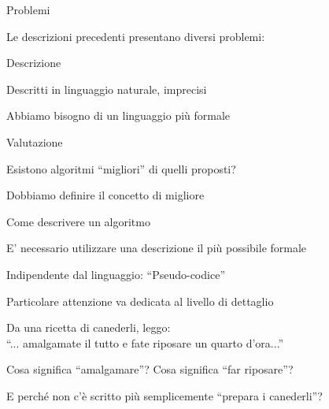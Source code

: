 \begin{frame}{Problemi}

Le descrizioni precedenti presentano diversi problemi:

\BIL
\item {\large\alert{Descrizione}}
\BI
\item Descritti in linguaggio naturale, imprecisi
\item Abbiamo bisogno di un linguaggio più formale
\EI
\item {\large\alert{Valutazione}}
\BI
\item Esistono algoritmi “migliori” di quelli proposti?
\item Dobbiamo definire il concetto di migliore
\EI
\EIL

\end{frame}

\begin{frame}{Come descrivere un algoritmo}

\BIL
\item E' necessario utilizzare una descrizione il più possibile formale
\item Indipendente dal linguaggio: “\alert{Pseudo-codice}”
\item Particolare attenzione va dedicata al livello di dettaglio
\BI
\item Da una ricetta di canederli, leggo:\\
“... amalgamate il tutto e fate riposare un quarto d'ora...”
\item Cosa significa “amalgamare”? Cosa significa “far riposare”? 
\item E perché non c'è scritto più semplicemente “prepara i canederli”?
\EI
\EIL

\end{frame}


